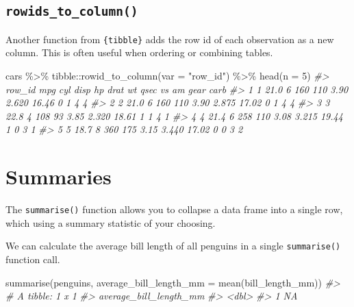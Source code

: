 \documentclass[
  12pt,
]{book}
\newenvironment{Shaded}{\begin{snugshade}}{\end{snugshade}}
\newcommand{\AttributeTok}[1]{\textcolor[rgb]{0.77,0.63,0.00}{#1}}
\newcommand{\CommentTok}[1]{\textcolor[rgb]{0.56,0.35,0.01}{\textit{#1}}}
\newcommand{\DecValTok}[1]{\textcolor[rgb]{0.00,0.00,0.81}{#1}}
\newcommand{\FunctionTok}[1]{\textcolor[rgb]{0.00,0.00,0.00}{#1}}
\newcommand{\NormalTok}[1]{#1}
\newcommand{\SpecialCharTok}[1]{\textcolor[rgb]{0.00,0.00,0.00}{#1}}
\newcommand{\StringTok}[1]{\textcolor[rgb]{0.31,0.60,0.02}{#1}}
\begin{document}
\hypertarget{rowids_to_column}{%
\subsection{\texorpdfstring{\texttt{rowids\_to\_column()}}{rowids\_to\_column()}}\label{rowids_to_column}}

Another function from \texttt{\{tibble\}} adds the row id of each observation as a new column. This is often useful when ordering or combining tables.

\begin{Shaded}
\begin{Highlighting}[]
\NormalTok{cars }\SpecialCharTok{\%\textgreater{}\%} 
\NormalTok{  tibble}\SpecialCharTok{::}\FunctionTok{rowid\_to\_column}\NormalTok{(}\AttributeTok{var =} \StringTok{"row\_id"}\NormalTok{) }\SpecialCharTok{\%\textgreater{}\%} 
  \FunctionTok{head}\NormalTok{(}\AttributeTok{n =} \DecValTok{5}\NormalTok{)}
\CommentTok{\#\textgreater{}   row\_id  mpg cyl disp  hp drat    wt  qsec vs am gear carb}
\CommentTok{\#\textgreater{} 1      1 21.0   6  160 110 3.90 2.620 16.46  0  1    4    4}
\CommentTok{\#\textgreater{} 2      2 21.0   6  160 110 3.90 2.875 17.02  0  1    4    4}
\CommentTok{\#\textgreater{} 3      3 22.8   4  108  93 3.85 2.320 18.61  1  1    4    1}
\CommentTok{\#\textgreater{} 4      4 21.4   6  258 110 3.08 3.215 19.44  1  0    3    1}
\CommentTok{\#\textgreater{} 5      5 18.7   8  360 175 3.15 3.440 17.02  0  0    3    2}
\end{Highlighting}
\end{Shaded}

\hypertarget{summaries}{%
\section{Summaries}\label{summaries}}

The \texttt{summarise()} function allows you to collapse a data frame into a single row, which using a summary statistic of your choosing.

We can calculate the average bill length of all penguins in a single \texttt{summarise()} function call.

\begin{Shaded}
\begin{Highlighting}[]
\FunctionTok{summarise}\NormalTok{(penguins, }\AttributeTok{average\_bill\_length\_mm =} \FunctionTok{mean}\NormalTok{(bill\_length\_mm))}
\CommentTok{\#\textgreater{} \# A tibble: 1 x 1}
\CommentTok{\#\textgreater{}   average\_bill\_length\_mm}
\CommentTok{\#\textgreater{}                    \textless{}dbl\textgreater{}}
\CommentTok{\#\textgreater{} 1                     NA}
\end{Highlighting}
\end{Shaded}
\end{document}

